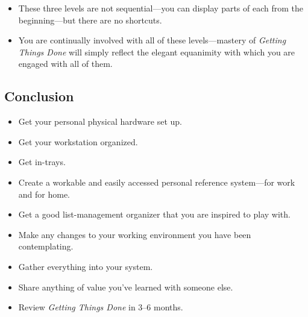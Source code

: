 \documentclass{article}
\begin{document}
\begin{itemize}
 \item These three levels are not sequential---you can display parts of each from the beginning---but there are no shortcuts.
 \item You are continually involved with all of these levels---mastery of \textit{Getting Things Done} will simply reflect the elegant equanimity with which you are engaged with all of them.
\end{itemize}

\subsection{Conclusion}

\begin{itemize}
 \item Get your personal physical hardware set up.
 \item Get your workstation organized.
 \item Get in-trays.
 \item Create a workable and easily accessed personal reference system---for work and for home.
 \item Get a good list-management organizer that you are inspired to play with.
 \item Make any changes to your working environment you have been contemplating.
 \item Gather everything into your system.
 \item Share anything of value you've learned with someone else.
 \item Review \textit{Getting Things Done} in 3--6 months.
\end{itemize}
\end{document}
